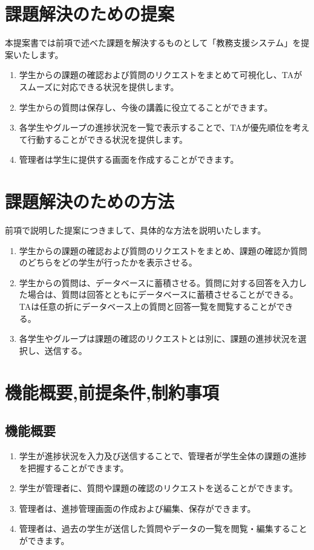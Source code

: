 \documentclass[a4j,titlepage]{ujarticle}
\begin{document}
\section{課題解決のための提案}
本提案書では前項で述べた課題を解決するものとして「教務支援システム」を提案いたします。

\begin{enumerate}[(1)]
\item 学生からの課題の確認および質問のリクエストをまとめて可視化し、TAがスムーズに対応できる状況を提供します。
\item 学生からの質問は保存し、今後の講義に役立てることができます。
\item 各学生やグループの進捗状況を一覧で表示することで、TAが優先順位を考えて行動することができる状況を提供します。
\item 管理者は学生に提供する画面を作成することができます。
\end{enumerate}

\section{課題解決のための方法}
前項で説明した提案につきまして、具体的な方法を説明いたします。
\begin{enumerate}[(1)]
\item 学生からの課題の確認および質問のリクエストをまとめ、課題の確認か質問のどちらをどの学生が行ったかを表示させる。
\item 学生からの質問は、データベースに蓄積させる。質問に対する回答を入力した場合は、質問は回答とともにデータベースに蓄積させることができる。TAは任意の折にデータベース上の質問と回答一覧を閲覧することができる。
\item 各学生やグループは課題の確認のリクエストとは別に、課題の進捗状況を選択し、送信する。
\end{enumerate}

\section{機能概要,前提条件,制約事項}

\subsection{機能概要}
\begin{enumerate}[(1)]
\item 学生が進捗状況を入力及び送信することで、管理者が学生全体の課題の進捗を把握することができます。
\item 学生が管理者に、質問や課題の確認のリクエストを送ることができます。
\item 管理者は、進捗管理画面の作成および編集、保存ができます。
\item 管理者は、過去の学生が送信した質問やデータの一覧を閲覧・編集することができます。　
\end{enumerate}
\end{document}
